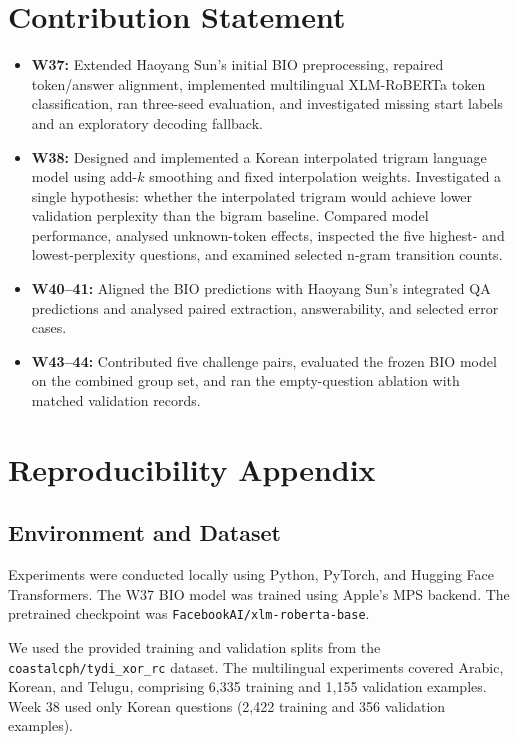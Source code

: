 \documentclass[11pt,a4paper,twocolumn]{article}
\begin{document}
\section{Contribution Statement}
\begin{itemize}
\item \textbf{W37:} Extended Haoyang Sun's initial BIO preprocessing, repaired token/answer alignment, implemented multilingual XLM-RoBERTa token classification, ran three-seed evaluation, and investigated missing start labels and an exploratory decoding fallback.

\item \textbf{W38:} Designed and implemented a Korean
interpolated trigram language model using add-$k$
smoothing and fixed interpolation weights.
Investigated a single hypothesis: whether the
interpolated trigram would achieve lower validation
perplexity than the bigram baseline. Compared model
performance, analysed unknown-token effects,
inspected the five highest- and lowest-perplexity
questions, and examined selected n-gram transition
counts.

\item \textbf{W40--41:} Aligned the BIO predictions with Haoyang Sun's integrated QA predictions and analysed paired extraction, answerability, and selected error cases.
\item \textbf{W43--44:} Contributed five challenge pairs, evaluated the frozen BIO model on the combined group set, and ran the empty-question ablation with matched validation records.
\end{itemize}

\section*{Reproducibility Appendix}

\subsection*{Environment and Dataset}
Experiments were conducted locally using Python,
PyTorch, and Hugging Face Transformers. The W37
BIO model was trained using Apple's MPS backend.
The pretrained checkpoint was
\texttt{FacebookAI/xlm-roberta-base}.

We used the provided training and validation splits
from the \texttt{coastalcph/tydi\_xor\_rc} dataset.
The multilingual experiments covered Arabic,
Korean, and Telugu, comprising 6,335 training
and 1,155 validation examples. Week 38 used
only Korean questions (2,422 training and 356
validation examples).
\end{document}
